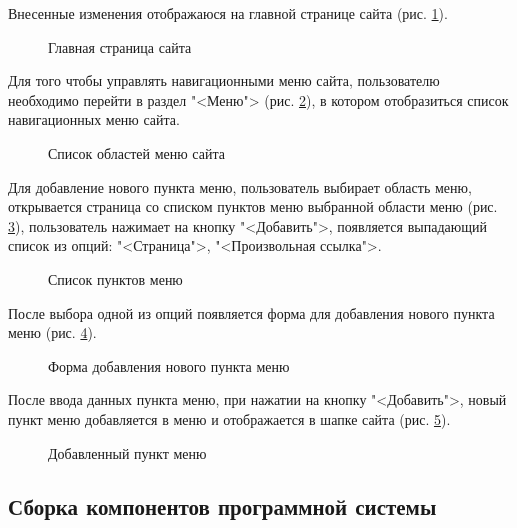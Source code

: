 Внесенные изменения отображаюся на главной странице сайта (рис. \ref{ui11:image}).

\begin{figure}[H]
	\center{\texttt{[image: ui11]}}
	\caption{Главная страница сайта}
	\label{ui11:image}
\end{figure}

Для того чтобы управлять навигационными меню сайта, пользователю необходимо перейти в раздел "<Меню"> (рис. \ref{ui12:image}), в котором отобразиться список навигационных меню сайта.

\begin{figure}[H]
	\center{\texttt{[image: ui12]}}
	\caption{Список областей меню сайта}
	\label{ui12:image}
\end{figure}

Для добавление нового пункта меню, пользователь выбирает область меню, открывается страница со списком пунктов меню выбранной области меню (рис. \ref{ui13:image}), пользователь нажимает на кнопку "<Добавить">, появляется выпадающий список из опций: "<Страница">, "<Произвольная ссылка">. 

\begin{figure}[H]
	\center{\texttt{[image: ui13]}}
	\caption{Список пунктов меню}
	\label{ui13:image}
\end{figure}

После выбора одной из опций появляется форма для добавления нового пункта меню (рис. \ref{ui14:image}).

\begin{figure}[H]
	\center{\texttt{[image: ui14]}}
	\caption{Форма добавления нового пункта меню}
	\label{ui14:image}
\end{figure}

После ввода данных пункта меню, при нажатии на кнопку "<Добавить">, новый пункт меню добавляется в меню и отображается в шапке сайта (рис. \ref{ui15:image}).

\begin{figure}[H]
	\center{\texttt{[image: ui15]}}
	\caption{Добавленный пункт меню}
	\label{ui15:image}
\end{figure}
		
		
		
\subsection{Сборка компонентов программной системы}


